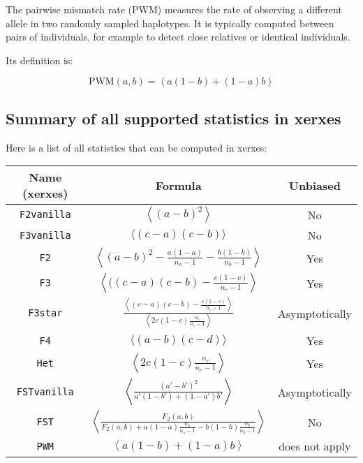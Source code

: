 \documentclass{article}
\begin{document}
The pairwise mismatch rate (PWM) measures the rate of observing a different allele in two randomly sampled haplotypes. It is typically computed between pairs of individuals, for example to detect close relatives or identical individuals. 

Its definition is:

$$\text{PWM}(a, b) = \left\langle a (1 - b) + (1 - a) b \right\rangle$$

\subsection{Summary of all supported statistics in xerxes}

Here is a list of all statistics that can be computed in xerxes:

\begin{center}
    \begin{tabular}{|c|c|c|}
        \hline
        \textbf{Name (xerxes)} & \textbf{Formula} & \textbf{Unbiased} \\
        \hline
        \hline
        \texttt{F2vanilla} & $\left\langle (a-b)^2\right\rangle$  & No  \\
        \hline
        \texttt{F3vanilla} & $\langle (c-a)(c-b) \rangle$ & No  \\
        \hline
        \texttt{F2} & $\left\langle (a-b)^2-\frac{a(1-a)}{n_a-1}-\frac{b(1-b)}{n_b-1}\right\rangle$  & Yes  \\
        \hline
        \texttt{F3} & $\left\langle( (c-a)(c-b)-\frac{c(1-c)}{n_c-1}\right\rangle$  & Yes  \\
        \hline
        \texttt{F3star} & $\frac{\left\langle (c-a)(c-b)-\frac{c(1-c)}{n_c-1}\right\rangle}{\left\langle 2 c(1-c )\frac{n_c}{n_c-1}\right\rangle}$ & Asymptotically  \\
        \hline
        \texttt{F4} & $\langle (a-b)(c-d) \rangle$  & Yes  \\
        \hline
        \texttt{Het} & $\left\langle 2 c(1-c )\frac{n_c}{n_c-1}\right\rangle$  & Yes \\
        \hline
        \texttt{FSTvanilla} & $\left\langle\frac{\left(a'-b'\right)^2}{a' \left(1-b'\right)+\left(1-a'\right) b'}\right\rangle$  & Asymptotically  \\
        \hline
        \texttt{FST} & $\left\langle \frac{F_2(a,b)}{F_2(a,b)+a(1-a) \frac{n_a}{n_a-1}-b(1-b) \frac{n_b}{n_b-1}}\right\rangle$  & No  \\
        \hline
        \texttt{PWM} & $\left\langle a (1 - b) + (1 - a) b \right\rangle$  & does not apply  \\
        \hline
    \end{tabular}
\end{center}
\end{document}
